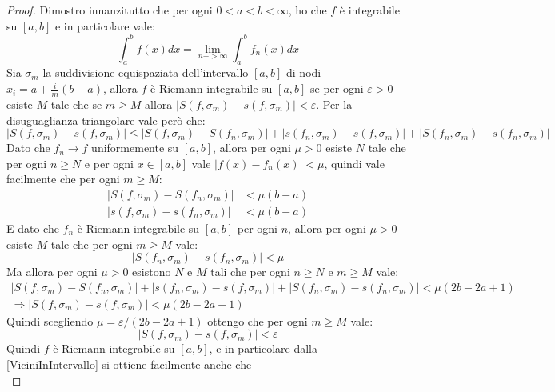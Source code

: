 \begin{proof}
 Dimostro innanzitutto che per ogni $0<a<b<\infty$, ho che $f$ è integrabile su $[a,b]$ e in particolare vale:
 \begin{equation*}
  \int_a^b{f(x)dx}=\lim_{n->\infty}\int_a^b{f_n(x)dx}
 \end{equation*}
  Sia $\sigma_m$ la suddivisione equispaziata dell'intervallo $[a,b]$ di nodi $x_i=a+\frac{i}{m}(b-a)$,
  allora $f$ è Riemann-integrabile su $[a,b]$ se per ogni $\varepsilon>0$ esiste $M$ tale che se $m\ge M$
  allora $|S(f,\sigma_m)-s(f,\sigma_m)|<\varepsilon$.
 Per la disuguaglianza triangolare vale però che:
 \begin{equation*}
  |S(f,\sigma_m)-s(f,\sigma_m)|\le  
  |S(f,\sigma_m)-S(f_n,\sigma_m)|+ |s(f_n,\sigma_m)-s(f,\sigma_m)|+ |S(f_n,\sigma_m)-s(f_n,\sigma_m)|
 \end{equation*}
 Dato che $f_n\to f$ uniformemente su $[a,b]$, allora per ogni $\mu>0$ esiste $N$ tale che per ogni
 $n\ge N$ e per ogni $x\in[a,b]$ vale $|f(x)-f_n(x)|<\mu$, quindi vale facilmente che per ogni $m\ge M$:
 \begin{equation} \label{ViciniInIntervallo}
 \begin{split}
 |S(f,\sigma_m)-S(f_n,\sigma_m)| & <\mu(b-a) \\
 |s(f,\sigma_m)-s(f_n,\sigma_m)| & <\mu(b-a)
 \end{split}
 \end{equation} 
 E dato che $f_n$ è Riemann-integrabile
 su $[a,b]$ per ogni $n$, allora per ogni $\mu>0$ esiste $M$ tale che per ogni $m\ge M$ vale:
 \begin{equation}
  |S(f_n,\sigma_m)-s(f_n,\sigma_m)|<\mu
 \end{equation}
 Ma allora per ogni $\mu>0$ esistono $N$ e $M$ tali che per ogni $n\ge N$ e $m\ge M$ vale:
 \begin{gather*}
  |S(f,\sigma_m)-S(f_n,\sigma_m)|+ |s(f_n,\sigma_m)-s(f,\sigma_m)|+ |S(f_n,\sigma_m)-s(f_n,\sigma_m)|<\mu(2b-2a+1) \\
  \Longrightarrow |S(f,\sigma_m)-s(f,\sigma_m)|< \mu(2b-2a+1)
 \end{gather*}
 Quindi scegliendo $\mu=\varepsilon/(2b-2a+1)$ ottengo che per ogni $m\ge M$ vale:
 \begin{equation*}
  |S(f,\sigma_m)-s(f,\sigma_m)|< \varepsilon
 \end{equation*}
 Quindi $f$ è Riemann-integrabile su $[a,b]$, e in particolare dalla \cref{ViciniInIntervallo} si ottiene facilmente
 anche che
 \begin{equation}\label{IntegraleInIntervallo}

\end{equation}
\end{proof}

